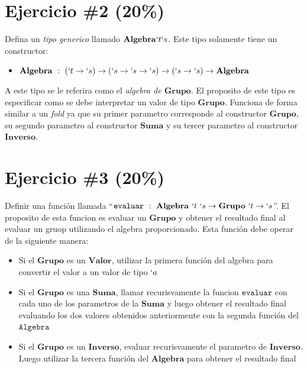 \documentclass{article}
\begin{document}
\section*{Ejercicio \#2 (20\%)}

Defina un \emph{tipo generico} llamado $\mathbf{Algebra} `t `s$. Este tipo solamente tiene un constructor:
\begin{itemize}
        \item $\mathbf{Algebra}\ :\ (`t \rightarrow `s)\rightarrow (`s\rightarrow`s\rightarrow`s)\rightarrow(`s \rightarrow `s)\rightarrow\mathbf{Algebra}$
\end{itemize}

A este tipo se le referira como el \emph{algebra de $\mathbf{Grupo}$}. El proposito de este tipo es especificar
como se debe interpretar un valor de tipo $\mathbf{Grupo}$. Funciona de forma similar a un \emph{fold} ya que
su primer parametro corresponde al constructor $\mathbf{Grupo}$, su segundo parametro al constructor $\mathbf{Suma}$
y su tercer parametro al constructor $\mathbf{Inverso}$.

\section*{Ejercicio \#3 (20\%)}

Definir una funci\'on llamada ``$\mathtt{evaluar}\ :\ \mathbf{Algebra}\ `t\ `s\rightarrow\mathbf{Grupo}\ `t\rightarrow`s$''. El proposito de esta funcion es evaluar un $\mathbf{Grupo}$ y
obtener el resultado final al evaluar un gruop utilizando el algebra proporcionado. Esta funci\'on debe operar de la siguiente manera:
\begin{itemize}
        \item{Si el $\mathbf{Grupo}$ es un $\mathbf{Valor}$, utilizar la primera funci\'on del algebra para convertir el valor
                a un valor de tipo $`a$}
        \item{Si el $\mathbf{Grupo}$ es una $\mathbf{Suma}$, llamar recurisvamente la funcion $\mathtt{evaluar}$ con cada
        uno de los parametros de la $\mathbf{Suma}$ y luego obtener el resultado final evaluando los dos valores obtenidos
        anteriormente con la segunda funci\'on del $\mathtt{Algebra}$}
        \item{Si el $\mathbf{Grupo}$ es un $\mathbf{Inverso}$, evaluar recurisvamente el parametro de $\mathbf{Inverso}$. Luego
        utilizar la tercera funci\'on del $\mathbf{Algebra}$ para obtener el resultado final}
\end{itemize}
\end{document}
